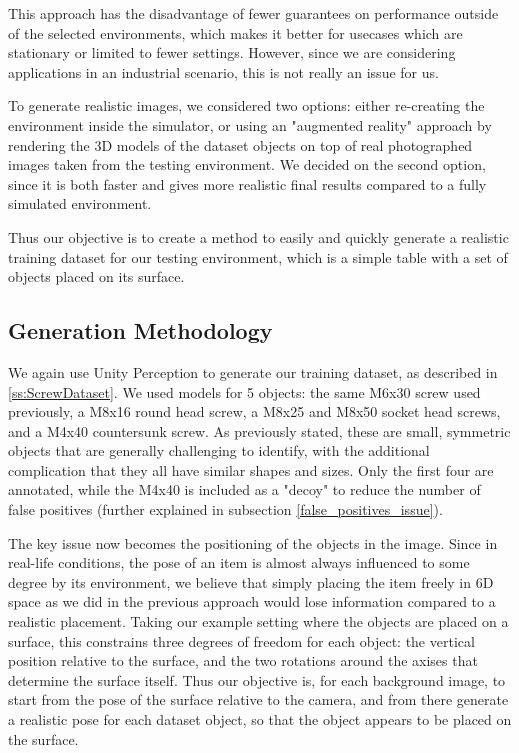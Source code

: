 This approach has the disadvantage of fewer guarantees on performance outside of the selected environments, which makes it better for usecases which are stationary or limited to fewer settings. However, since we are considering applications in an industrial scenario, this is not really an issue for us.

To generate realistic images, we considered two options: either re-creating the environment inside the simulator, or using an "augmented reality" approach by rendering the 3D models of the dataset objects on top of real photographed images taken from the testing environment. We decided on the second option, since it is both faster and gives more realistic final results compared to a fully simulated environment.

Thus our objective is to create a method to easily and quickly generate a realistic training dataset for our testing environment, which is a simple table with a set of objects placed on its surface.

\subsection{Generation Methodology}

We again use Unity Perception to generate our training dataset, as described in \ref{ss:ScrewDataset}. We used models for 5 objects: the same M6x30 screw used previously, a M8x16 round head screw, a M8x25 and M8x50 socket head screws, and a M4x40 countersunk screw. As previously stated, these are small, symmetric objects that are generally challenging to identify, with the additional complication that they all have similar shapes and sizes. Only the first four are annotated, while the M4x40 is included as a "decoy" to reduce the number of false positives (further explained in subsection \ref{false_positives_issue}).

The key issue now becomes the positioning of the objects in the image. Since in real-life conditions, the pose of an item is almost always influenced to some degree by its environment, we believe that simply placing the item freely in 6D space as we did in the previous approach would lose information compared to a realistic placement. Taking our example setting where the objects are placed on a surface, this constrains three degrees of freedom for each object: the vertical position relative to the surface, and the two rotations around the axises that determine the surface itself. Thus our objective is, for each background image, to start from the pose of the surface relative to the camera, and from there generate a realistic pose for each dataset object, so that the object appears to be placed on the surface.

